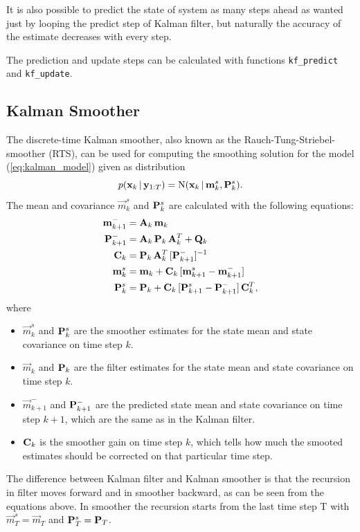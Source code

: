 It is also possible to predict the state of system as many steps ahead as wanted just by looping
the predict step of Kalman filter, but naturally the accuracy of the estimate decreases with every
step.

The prediction and update steps can be calculated with functions \texttt{kf\_predict}
and \texttt{kf\_update}.

\subsection{Kalman Smoother}

The discrete-time Kalman smoother, also known as the Rauch-Tung-Striebel-smoother (RTS), 
\citep{Rauch+Tung+Striebel:1965,Gelb:1974,Bar-Shalom+Li+Kirubarajan:2001} can be used for computing
the smoothing solution for the model (\ref{eq:kalman_model}) given as distribution
%
\begin{equation}
  p(\mathbf{x}_{k}\,|\,\mathbf{y}_{1:T}) =
    \operatorname{N}(\mathbf{x}_{k}\,|\,\mathbf{m}^s_{k},\mathbf{P}^s_{k}).
\end{equation}
%
The mean and covariance $\vec{m}^s_{k}$ and $\mathbf{P}^s_{k}$ are calculated with the following equations:
%
\begin{equation}
\begin{split}
    \mathbf{m}^-_{k+1} &= \mathbf{A}_k \, \mathbf{m}_k  \\
    \mathbf{P}^-_{k+1} &= \mathbf{A}_k \, \mathbf{P}_k \, \mathbf{A}_k^T + \mathbf{Q}_k \\
    \mathbf{C}_{k} &= \mathbf{P}_k \, \mathbf{A}_k^T \, [\mathbf{P}^-_{k+1}]^{-1} \\
    \mathbf{m}^s_k &= \mathbf{m}_k
    + \mathbf{C}_k \, [\mathbf{m}^s_{k+1} - \mathbf{m}^-_{k+1}] \\
    \mathbf{P}^s_k &= \mathbf{P}_k
    + \mathbf{C}_k \, [\mathbf{P}^s_{k+1} - \mathbf{P}^-_{k+1}] \, \mathbf{C}^T_k,
\end{split}
\label{eq:kfrts}
\end{equation}
%
where
%
\begin{itemize}
%
\item $\vec{m}^s_k$ and $\mathbf{P}^s_k$ are the smoother estimates for the state mean and state
covariance on time step $k$.
%
\item $\vec{m}_k$ and $\mathbf{P}_k$ are the filter estimates for the state mean and state 
covariance on time step $k$.
%
\item $\vec{m}^-_{k+1}$ and $\mathbf{P}^-_{k+1}$ are the predicted state mean and state covariance
on time step $k+1$, which are the same as in the Kalman filter.
%
\item $\mathbf{C}_k$ is the smoother gain on time step $k$, which tells how much the smooted estimates
should be corrected on that particular time step.
%
\end{itemize}
%
The difference between Kalman filter and Kalman smoother is that the recursion in filter moves
forward and in smoother backward, as can be seen from the equations above. In smoother the recursion
starts from the last time step T with $\vec{m}^s_T = \vec{m}_T$ and $\mathbf{P}^s_T = \mathbf{P}_T$. 

